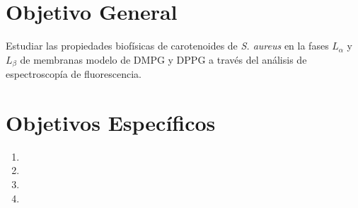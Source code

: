 \documentclass[12pt]{article}
\begin{document}
\section{Objetivo General}

Estudiar las propiedades biof\'isicas de carotenoides de \textit{S. aureus} en la fases $L_\alpha$ y $L_\beta$ de membranas modelo de DMPG y DPPG a trav\'es del an\'alisis de espectroscop\'ia de fluorescencia.

\section{Objetivos Espec\'ificos}


\begin{enumerate}
	\item 
	\item 
	\item 
	\item 
\end{enumerate}
\end{document}
